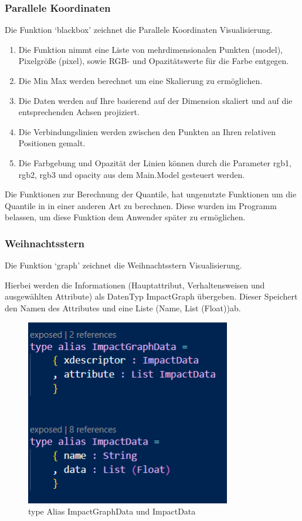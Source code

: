 \documentclass[usegeometry=true]{scrartcl}
\begin{document}
\subsubsection{Parallele Koordinaten}

Die Funktion `blackbox' zeichnet die Parallele Koordinaten Visualisierung.

\begin{enumerate}
\item Die Funktion nimmt eine Liste von mehrdimensionalen Punkten (model), Pixelgröße (pixel), sowie RGB- und Opazitätswerte für die Farbe entgegen.
\item Die Min Max werden berechnet um eine Skalierung zu ermöglichen.
\item Die Daten werden auf Ihre basierend auf der Dimension skaliert und auf die entsprechenden Achsen projiziert.
\item Die Verbindungslinien werden zwischen den Punkten an Ihren relativen Positionen gemalt.
\item Die Farbgebung und Opazität der Linien können durch die Parameter rgb1, rgb2, rgb3 und opacity aus dem Main.Model gesteuert werden.
\end{enumerate}

Die Funktionen zur Berechnung der Quantile, hat ungenutzte Funktionen um die Quantile in in einer anderen Art zu berechnen. Diese wurden im Programm belassen, um diese Funktion dem Anwender später zu ermöglichen.

\subsubsection{Weihnachtsstern}
Die Funktion `graph' zeichnet die Weihnachtsstern Visualisierung.

Hierbei werden die Informationen (Hauptattribut, Verhaltensweisen und ausgewählten Attribute) als DatenTyp ImpactGraph übergeben. Dieser Speichert den Namen des Attributes und eine Liste (Name, List (Float))ab. 


\begin{figure}[h]
  \centering
  \includegraphics[width = 0.8\textwidth]{ImpactGraphData.JPG}
  \caption{ type Alias ImpactGraphData und ImpactData}
\end{figure}
\end{document}
